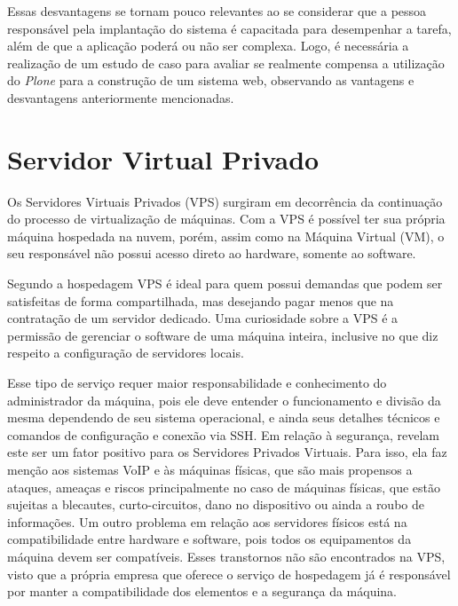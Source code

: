 Essas desvantagens se tornam pouco relevantes ao se considerar que a pessoa responsável pela implantação do sistema é capacitada para desempenhar a tarefa, além de que a aplicação poderá ou não ser complexa. Logo, é necessária a realização de um estudo de caso para avaliar se realmente compensa a utilização do \textit{Plone} para a construção de um sistema web, observando as vantagens e desvantagens anteriormente mencionadas. 

\hspace{2.5cm}

\section{Servidor Virtual Privado}
\label{sec:vps}

\hspace{2.5cm}

Os Servidores Virtuais Privados (VPS) surgiram em decorrência da continuação do processo de virtualização de máquinas. Com a VPS é possível ter sua própria máquina hospedada na nuvem, porém, assim como na Máquina Virtual (VM), o seu responsável não possui acesso direto ao hardware, somente ao software.

Segundo  a hospedagem VPS é ideal para quem possui demandas que podem ser satisfeitas de forma compartilhada, mas desejando pagar menos que na contratação de um servidor dedicado. Uma curiosidade sobre a VPS é a permissão de gerenciar o software de uma máquina inteira, inclusive no que diz respeito a configuração de servidores locais. 

Esse tipo de serviço requer maior responsabilidade e conhecimento do administrador da máquina, pois ele deve entender o funcionamento e divisão da mesma dependendo de seu sistema operacional, e ainda seus detalhes técnicos e comandos de configuração e conexão via SSH. Em relação à segurança,  revelam este ser um fator positivo para os Servidores Privados Virtuais. Para isso, ela faz menção aos sistemas VoIP e às máquinas físicas, que são mais propensos a ataques, ameaças e riscos principalmente no caso de máquinas físicas, que estão sujeitas a blecautes, curto-circuitos, dano no dispositivo ou ainda a roubo de informações. Um outro problema em relação aos servidores físicos está na compatibilidade entre hardware e software, pois todos os equipamentos da máquina devem ser compatíveis. Esses transtornos não são encontrados na VPS, visto que a própria empresa que oferece o serviço de hospedagem já é responsável por manter a compatibilidade dos elementos e a segurança da máquina.  


